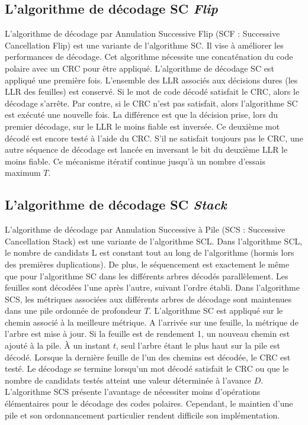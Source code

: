 \subsection{L'algorithme de décodage SC \textit{Flip}}

	L'algorithme de décodage par Annulation Successive \og Flip \fg (SCF : Successive Cancellation Flip) \cite{afisiadis_low-complexity_2014} est une variante de l'algorithme SC. Il vise à améliorer les performances de décodage. Cet algorithme nécessite une concaténation du code polaire avec un CRC pour être appliqué. L'algorithme de décodage SC est appliqué une première fois. L'ensemble des LLR associés aux décisions dures (les LLR des feuilles) est conservé. Si le mot de code décodé satisfait le CRC, alors le décodage s'arrête. Par contre, si le CRC n'est pas satisfait, alors l'algorithme SC est exécuté une nouvelle fois. La différence est que la décision prise, lors du premier décodage, sur le LLR le moins fiable est inversée. Ce deuxième mot décodé est encore testé à l'aide du CRC. S'il ne satisfait toujours pas le CRC, une autre séquence de décodage est lancée en inversant le bit du deuxième LLR le moins fiable. Ce mécanisme itératif continue jusqu'à un nombre d'essais maximum $T$.


	\subsection{L'algorithme de décodage SC \textit{Stack}}
	L'algorithme de décodage par Annulation Successive à Pile (SCS : Successive Cancellation Stack) \cite{niu_stack_2012} est une variante de l'algorithme SCL. Dans l'algorithme SCL, le nombre de candidats $\mathrm{L}$ est constant tout au long de l'algorithme (hormis lors des premières duplications). De plus, le séquencement est exactement le même que pour l'algorithme SC dans les différents arbres décodés parallèlement. Les feuilles sont décodées l'une après l'autre, suivant l'ordre établi. Dans l'algorithme SCS, les métriques associées aux différents arbres de décodage sont maintenues dans une pile ordonnée de profondeur $T$. L'algorithme SC est appliqué sur le chemin associé à la meilleure métrique. A l'arrivée sur une feuille, la métrique de l'arbre est mise à jour. Si la feuille est de rendement 1, un nouveau chemin est ajouté à la pile. \`A un instant $t$, seul l'arbre étant le plus haut sur la pile est décodé. Lorsque la dernière feuille de l'un des chemins est décodée, le CRC est testé. Le décodage se termine lorsqu'un mot décodé satisfait le CRC ou que le nombre de candidats testés atteint une valeur déterminée à l'avance $D$. L'algorithme SCS présente l'avantage de nécessiter moins d'opérations élémentaires pour le décodage des codes polaires. Cependant, le maintien d'une pile et son ordonnancement particulier rendent difficile son implémentation.

